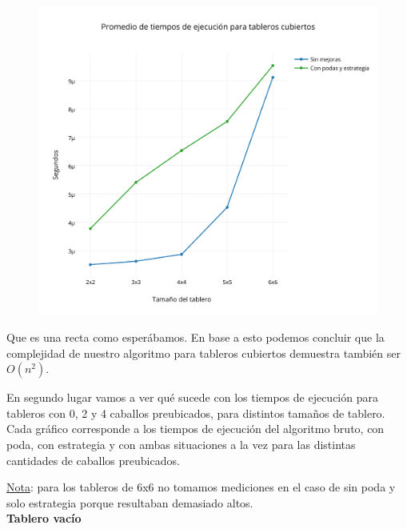  \begin{figure}[h!]
   \begin{center}
	\includegraphics[scale=0.3]{../src/ej3/Mediciones/cubiertos/Promedio.png} 
   \end{center}
 \end{figure}

Que es una recta como esper\'abamos. En base a esto podemos concluir que la complejidad de nuestro algoritmo para tableros cubiertos demuestra también ser $O(n^{2})$.\\
\newpage

En segundo lugar vamos a ver qué sucede con los tiempos de ejecuci\'on para tableros con 0, 2 y 4 caballos preubicados, para distintos tama\~nos de tablero. Cada gr\'afico corresponde a los tiempos de ejecuci\'on del algoritmo bruto, con poda, con estrategia y con ambas situaciones a la vez para las distintas cantidades de caballos preubicados.

\underline{Nota}: para los tableros de 6x6 no tomamos mediciones en el caso de sin poda y solo estrategia porque resultaban demasiado altos.\\

\textbf{{\Large Tablero vacío}}

